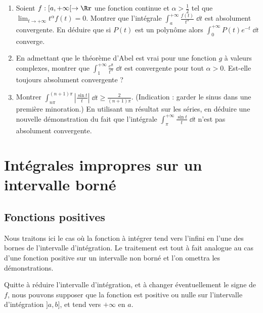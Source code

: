 \documentclass[class=report,crop=false]{standalone}
\begin{document}
\begin{miniexercices}
\begin{enumerate}

 
  \item Soient $f :[a,+\infty[ \to \Rr$ une fonction continue et $\alpha > \frac12$
  tel que $\lim_{t\to+\infty} t^\alpha f(t) = 0$.
  Montrer que l'intégrale $\int_a^{+\infty} \frac{f(t)}{t^\alpha}\;\dd t$ est  absolument convergente.
  En déduire que si $P(t)$ est un polynôme alors
  $\int_0^{+\infty} P(t)e^{-t}\;\dd t$ converge.


  \item En admettant que le théorème d'Abel est vrai pour une fonction $g$ à valeurs complexes,
  montrer que $\int_1^{+\infty} \frac{e^{\ii t}}{t^\alpha}\; \dd t$ est convergente pour tout $\alpha > 0$.
  Est-elle toujours absolument convergente ?
  
  \item Montrer $\int_{n\pi}^{(n+1)\pi} \left|\frac{\sin t}{t}\right| \;\dd t \ge \frac{2}{(n+1)\pi}$.
  (Indication : garder le sinus dans une première minoration.)
  En utilisant un résultat sur les séries, en déduire une nouvelle démonstration du fait 
  que l'intégrale $\int_\pi^{+\infty} \frac{\sin t}{t} \;\dd t$ n'est pas absolument convergente. 
\end{enumerate}
\end{miniexercices}





\section{Intégrales impropres sur un intervalle borné}


\subsection{Fonctions positives}

Nous traitons ici le cas où la fonction à intégrer tend vers
l'infini en l'une des bornes de l'intervalle d'intégration. 
Le traitement est tout à fait analogue au cas d'une fonction positive 
sur un intervalle non borné et l'on omettra les démonstrations.

Quitte à réduire l'intervalle d'intégration, et à changer
éventuellement le signe de $f$, nous pouvons supposer que la
fonction est positive ou nulle sur l'intervalle d'intégration
$]a,b]$, et tend vers $+\infty$ en $a$.  
\end{document}

